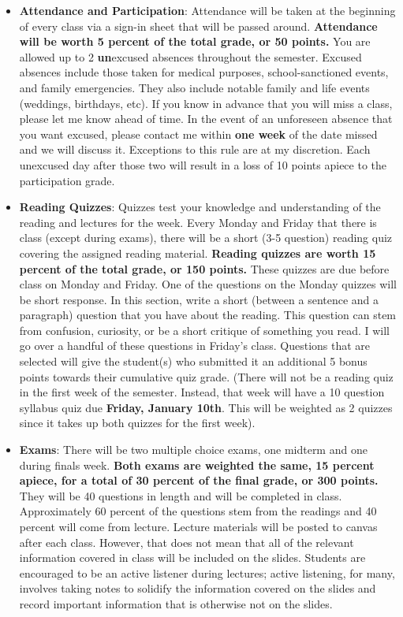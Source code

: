 \documentclass[11pt]{article}
\begin{document}
\begin{itemize}
	\item \textbf{Attendance and Participation}: Attendance will be taken at the beginning of every class via a sign-in sheet that will be passed around. \textbf{Attendance will be worth 5 percent of the total grade, or 50 points.} You are allowed up to 2 \textbf{un}excused absences throughout the semester. Excused absences include those taken for medical purposes, school-sanctioned events, and family emergencies. They also include notable family and life events (weddings, birthdays, etc). If you know in advance that you will miss a class, please let me know ahead of time. In the event of an unforeseen absence that you want excused, please contact me within \textbf{one week} of the date missed and we will discuss it. Exceptions to this rule are at my discretion. Each unexcused day after those two will result in a loss of 10 points apiece to the participation grade.
	\item \textbf{Reading Quizzes}: Quizzes test your knowledge and understanding of the reading and lectures for the week. Every Monday and Friday that there is class (except during exams), there will be a short (3-5 question) reading quiz covering the assigned reading material. \textbf{Reading quizzes are worth 15 percent of the total grade, or 150 points.} These quizzes are due before class on Monday and Friday. One of the questions on the Monday quizzes will be short response. In this section, write a short (between a sentence and a paragraph) question that you have about the reading. This question can stem from confusion, curiosity, or be a short critique of something you read. I will go over a handful of these questions in Friday’s class. Questions that are selected will give the student(s) who submitted it an additional 5 bonus points towards their cumulative quiz grade. (There will not be a reading quiz in the first week of the semester. Instead, that week will have a 10 question syllabus quiz due \textbf{Friday, January 10th}. This will be weighted as 2 quizzes since it takes up both quizzes for the first week).  
	\item \textbf{Exams}: There will be two multiple choice exams, one midterm and one during finals week. \textbf{Both exams are weighted the same, 15 percent apiece, for a total of 30 percent of the final grade, or 300 points.} They will be 40 questions in length and will be completed in class. Approximately 60 percent of the questions stem from the readings and 40 percent will come from lecture. Lecture materials will be posted to canvas after each class. However, that does not mean that all of the relevant information covered in class will be included on the slides. Students are encouraged to be an active listener during lectures; active listening, for many, involves taking notes to solidify the information covered on the slides and record important information that is otherwise not on the slides. 

\end{itemize}
\end{document}
